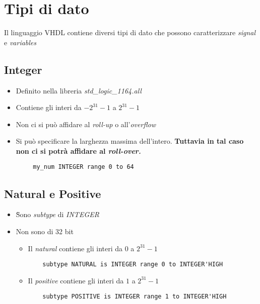 \documentclass{article}
\begin{document}
\newpage

\section{Tipi di dato}
Il linguaggio VHDL contiene diversi tipi di dato che possono caratterizzare \textit{signal} e \textit{variables}
\subsection{Integer}
\begin{itemize}
	\item Definito nella libreria \textit{std\_logic\_1164.all}
	\item Contiene gli interi da \(-2^{31}-1\) a \(2^{31}-1\)
	\item Non ci si può affidare al \textit{roll-up} o all'\textit{overflow}
	\item Si può specificare la larghezza massima dell'intero. \textbf{Tuttavia in tal caso non ci si potrà affidare al \textit{roll-over.}} 
\end{itemize}
\begin{verbatim}
        my_num INTEGER range 0 to 64
\end{verbatim}
\subsection{Natural e Positive}
\begin{itemize}
	\item \`Sono \textit{subtype} di \textit{INTEGER}
	\item Non sono di 32 bit
	\begin{itemize}
		\item Il \textit{natural} contiene gli interi da \(0\) a \(2^{31}-1\)
\begin{verbatim}
    subtype NATURAL is INTEGER range 0 to INTEGER'HIGH
 \end{verbatim}
		\item Il \textit{positive} contiene gli interi da \(1\) a \(2^{31}-1\)
\begin{verbatim}
    subtype POSITIVE is INTEGER range 1 to INTEGER'HIGH
 \end{verbatim}
	\end{itemize}	
\end{itemize}
\end{document}
